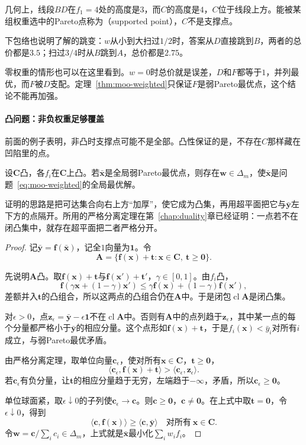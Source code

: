 几何上，线段$BD$在$f_1=4$处的高度是$3$，而$C$的高度是$4$，$C$位于线段上方。能被某组权重选中的Pareto点称为（supported point），$C$不是支撑点。

下包络也说明了解的跳变：$w$从小到大扫过$1/2$时，答案从$D$直接跳到$B$，两者的总价都是$3.5$；扫过$3/4$时从$B$跳到$A$，总价都是$2.75$。

零权重的情形也可以在这里看到。$w=0$时总价就是误差，$D$和$F$都等于$1$，并列最优，而$F$被$D$支配。定理~\ref{thm:moo-weighted}只保证$F$是弱Pareto最优点，这个结论不能再加强。

\paragraph{凸问题：非负权重足够覆盖}
前面的例子表明，非凸时支撑点可能不是全部。凸性保证的是，不存在$C$那样藏在凹陷里的点。

\begin{theorem}[凸问题的支撑权重]
\label{thm:moo-convex-support}
设$\bm{C}$凸，各$f_i$在$\bm{C}$上凸。若$\bar{\bm{x}}$是全局弱Pareto最优点，则存在$\bm{w}\in\Delta_m$，使$\bar{\bm{x}}$是问题~\eqref{eq:moo-weighted}的全局最优解。
\end{theorem}

证明的思路是把可达集合向右上方“加厚”，使它成为凸集，再用超平面把它与$\bar{\bm{y}}$左下方的点隔开。所用的严格分离定理在第~\ref{chap:duality}章已经证明：一点若不在闭凸集中，就存在超平面把二者严格分开。

\begin{proof}
记$\bar{\bm{y}}=\bm{f}(\bar{\bm{x}})$，记全$1$向量为$\bm{1}$。令
\[
 \bm{A}=\{\bm{f}(\bm{x})+\bm{t}:\bm{x}\in\bm{C},\ \bm{t}\geq\bm{0}\}.
\]

先说明$\bm{A}$凸。取$\bm{f}(\bm{x})+\bm{t}$与$\bm{f}(\bm{x}')+\bm{t}'$，$\gamma\in[0,1]$。由$f_i$凸，
\[
 \bm{f}(\gamma\bm{x}+(1-\gamma)\bm{x}')\leq\gamma\bm{f}(\bm{x})+(1-\gamma)\bm{f}(\bm{x}'),
\]
差额并入$\bm{t}$的凸组合，所以这两点的凸组合仍在$\bm{A}$中。于是闭包$\operatorname{cl}\bm{A}$是闭凸集。

对$\epsilon>0$，点$\bm{z}_\epsilon=\bar{\bm{y}}-\epsilon\bm{1}$不在$\operatorname{cl}\bm{A}$中。否则有$\bm{A}$中的点列趋于$\bm{z}_\epsilon$，其中某一点的每个分量都严格小于$\bar{\bm{y}}$的相应分量。这个点形如$\bm{f}(\bm{x})+\bm{t}$，于是$f_i(\bm{x})<\bar{y}_i$对所有$i$成立，与弱Pareto最优矛盾。

由严格分离定理，取单位向量$\bm{c}_\epsilon$，使对所有$\bm{x}\in\bm{C}$，$\bm{t}\geq\bm{0}$，
\[
 \langle\bm{c}_\epsilon,\bm{f}(\bm{x})+\bm{t}\rangle>\langle\bm{c}_\epsilon,\bm{z}_\epsilon\rangle.
\]
若$\bm{c}_\epsilon$有负分量，让$\bm{t}$的相应分量趋于无穷，左端趋于$-\infty$，矛盾，所以$\bm{c}_\epsilon\geq\bm{0}$。

单位球面紧，取$\epsilon\downarrow0$的子列使$\bm{c}_\epsilon\to\bm{c}$。则$\bm{c}\geq\bm{0}$，$\bm{c}\neq\bm{0}$。在上式中取$\bm{t}=\bm{0}$，令$\epsilon\downarrow0$，得到
\[
 \langle\bm{c},\bm{f}(\bm{x})\rangle\geq\langle\bm{c},\bar{\bm{y}}\rangle\quad\text{对所有}\ \bm{x}\in\bm{C}.
\]
令$\bm{w}=\bm{c}/\sum_ic_i\in\Delta_m$，上式就是$\bar{\bm{x}}$最小化$\sum_iw_if_i$。
\end{proof}

